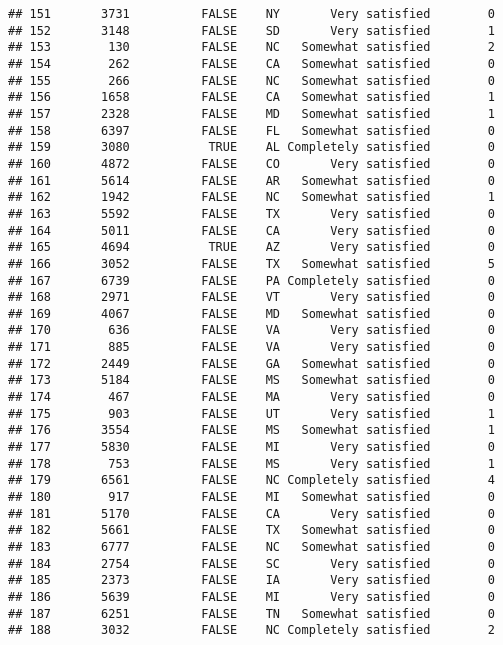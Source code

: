 \documentclass[]{book}
\theoremstyle{definition}
\theoremstyle{definition}
\theoremstyle{remark}
\begin{document}
\begin{verbatim}
## 151       3731          FALSE    NY       Very satisfied        0
## 152       3148          FALSE    SD       Very satisfied        1
## 153        130          FALSE    NC   Somewhat satisfied        2
## 154        262          FALSE    CA   Somewhat satisfied        0
## 155        266          FALSE    NC   Somewhat satisfied        0
## 156       1658          FALSE    CA   Somewhat satisfied        1
## 157       2328          FALSE    MD   Somewhat satisfied        1
## 158       6397          FALSE    FL   Somewhat satisfied        0
## 159       3080           TRUE    AL Completely satisfied        0
## 160       4872          FALSE    CO       Very satisfied        0
## 161       5614          FALSE    AR   Somewhat satisfied        0
## 162       1942          FALSE    NC   Somewhat satisfied        1
## 163       5592          FALSE    TX       Very satisfied        0
## 164       5011          FALSE    CA       Very satisfied        0
## 165       4694           TRUE    AZ       Very satisfied        0
## 166       3052          FALSE    TX   Somewhat satisfied        5
## 167       6739          FALSE    PA Completely satisfied        0
## 168       2971          FALSE    VT       Very satisfied        0
## 169       4067          FALSE    MD   Somewhat satisfied        0
## 170        636          FALSE    VA       Very satisfied        0
## 171        885          FALSE    VA       Very satisfied        0
## 172       2449          FALSE    GA   Somewhat satisfied        0
## 173       5184          FALSE    MS   Somewhat satisfied        0
## 174        467          FALSE    MA       Very satisfied        0
## 175        903          FALSE    UT       Very satisfied        1
## 176       3554          FALSE    MS   Somewhat satisfied        1
## 177       5830          FALSE    MI       Very satisfied        0
## 178        753          FALSE    MS       Very satisfied        1
## 179       6561          FALSE    NC Completely satisfied        4
## 180        917          FALSE    MI   Somewhat satisfied        0
## 181       5170          FALSE    CA       Very satisfied        0
## 182       5661          FALSE    TX   Somewhat satisfied        0
## 183       6777          FALSE    NC   Somewhat satisfied        0
## 184       2754          FALSE    SC       Very satisfied        0
## 185       2373          FALSE    IA       Very satisfied        0
## 186       5639          FALSE    MI       Very satisfied        0
## 187       6251          FALSE    TN   Somewhat satisfied        0
## 188       3032          FALSE    NC Completely satisfied        2

\end{verbatim}
\end{document}
